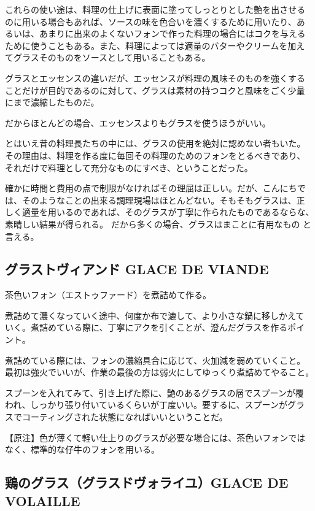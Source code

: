 \documentclass[twoside,12Q,b5paper,tombo]{escoffierltjsbook}
\newenvironment{recette}{\begin{multicols}{2}}{\end{multicols}}
\begin{document}
\begin{recette}
これらの使い途は、料理の仕上げに表面に塗ってしっとりとした艶を出させる
のに用いる場合もあれば、ソースの味を色合いを濃くするために用いたり、あ
るいは、あまりに出来のよくないフォンで作った料理の場合にはコクを与える
ために使うこともある。また、料理によっては適量のバターやクリームを加え
てグラスそのものをソースとして用いることもある。

グラスとエッセンスの違いだが、エッセンスが料理の風味そのものを強くする
ことだけが目的であるのに対して、グラスは素材の持つコクと風味をごく少量
にまで濃縮したものだ。

だからほとんどの場合、エッセンスよりもグラスを使うほうがいい。

とはいえ昔の料理長たちの中には、グラスの使用を絶対に認めない者もいた。
その理由は、料理を作る度に毎回その料理のためのフォンをとるべきであり、
それだけで料理として充分なものにすべき、ということだった。

確かに時間と費用の点で制限がなければその理屈は正しい。だが、こんにちで
は、そのようなことの出来る調理現場はほとんどない。そもそもグラスは、正
しく適量を用いるのであれば、そのグラスが丁寧に作られたものであるならな、
素晴しい結果が得られる。 だから多くの場合、グラスはまことに有用なもの
と言える。

\subsection{グラストヴィアンド GLACE DE
VIANDE}\label{ux30b0ux30e9ux30b9ux30c8ux30f4ux30a3ux30a2ux30f3ux30c9-glace-de-viande}

茶色いフォン（エストゥファード）を煮詰めて作る。

煮詰めて濃くなっていく途中、何度か布で漉して、より小さな鍋に移しかえて
いく。煮詰めている際に、丁寧にアクを引くことが、澄んだグラスを作るポイ
ント。

煮詰めている際には、フォンの濃縮具合に応じて、火加減を弱めていくこと。
最初は強火でいいが、作業の最後の方は弱火にしてゆっくり煮詰めてやること。

スプーンを入れてみて、引き上げた際に、艶のあるグラスの層でスプーンが覆
われ、しっかり張り付いているくらいが丁度いい。要するに、スプーンがグラ
スでコーティングされた状態になればいいということだ。

【原注】色が薄くて軽い仕上りのグラスが必要な場合には、茶色いフォンでは
なく、標準的な仔牛のフォンを用いる。

\subsection{鶏のグラス（グラスドヴォライユ）GLACE DE
VOLAILLE}\label{ux9d8fux306eux30b0ux30e9ux30b9ux30b0ux30e9ux30b9ux30c9ux30f4ux30a9ux30e9ux30a4ux30e6glace-de-volaille}


\end{recette}
\end{document}
